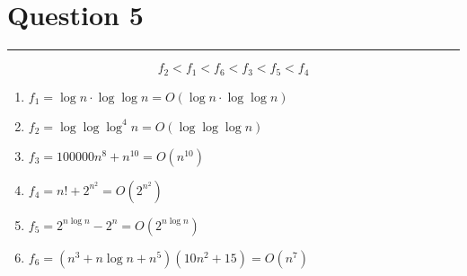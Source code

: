 \documentclass{article}
\begin{document}
\section*{Question 5}
\hrule
\vspace{0.5cm}

\[f_2 < f_1 < f_6 < f_3 < f_5 < f_4\]

\begin{enumerate}
    \item $f_1 = \log n \cdot \log \log n = O(\log n \cdot \log \log n)$
    \item $f_2 = \log \log \log^4 n = O(\log \log \log n)$
    \item $f_3 = 100000n^8 + n^10 = O(n^{10})$
    \item $f_4 = n! + 2^{n^2} = O(2^{n^2})$
    \item $f_5 = 2^{n\log n} - 2^n = O(2^{n \log n})$
    \item $f_6 = (n^3 + n \log n + n^5)(10n^2 + 15) = O(n^7)$
\end{enumerate}
\end{document}
